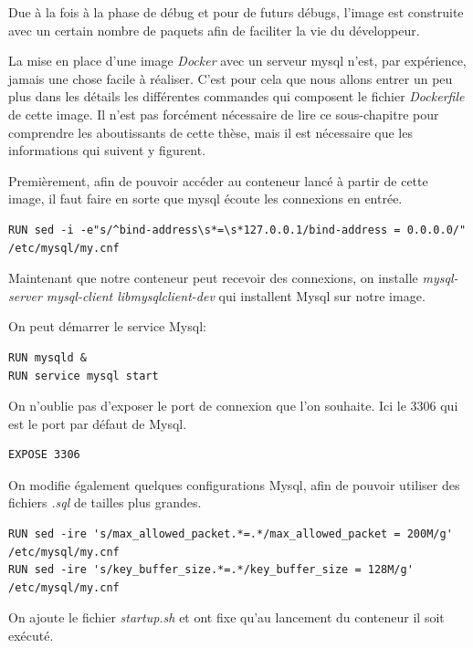 Due à la fois à la phase de débug et pour de futurs débugs, l'image est construite avec un certain nombre de paquets afin de faciliter la vie du développeur.

La mise en place d'une image \emph{Docker} avec un serveur mysql n'est, par expérience, jamais une chose facile à réaliser. C'est pour cela que nous allons entrer un peu plus dans les détails les différentes commandes qui composent le fichier \emph{Dockerfile} de cette image. Il n'est pas forcément nécessaire de lire ce sous-chapitre pour comprendre les aboutissants de cette thèse, mais il est nécessaire que les informations qui suivent y figurent.

Premièrement, afin de pouvoir accéder au conteneur lancé à partir de cette image, il faut faire en sorte que mysql écoute les connexions en entrée.

\lstset{language=bash}

\begin{lstlisting}[frame=single]
RUN sed -i -e"s/^bind-address\s*=\s*127.0.0.1/bind-address = 0.0.0.0/" /etc/mysql/my.cnf
\end{lstlisting}

Maintenant que notre conteneur peut recevoir des connexions, on installe \emph{mysql-server mysql-client libmysqlclient-dev} qui installent Mysql sur notre image.

On peut démarrer le service Mysql:

\begin{lstlisting}[frame=single]
RUN mysqld &
RUN service mysql start
\end{lstlisting}

On n’oublie pas d'exposer le port de connexion que l'on souhaite. Ici le 3306 qui est le port par défaut de Mysql.

\begin{lstlisting}[frame=single]
EXPOSE 3306
\end{lstlisting}

On modifie également quelques configurations Mysql, afin de pouvoir utiliser des fichiers \emph{.sql} de tailles plus grandes.

\begin{lstlisting}[frame=single]
RUN sed -ire 's/max_allowed_packet.*=.*/max_allowed_packet = 200M/g' /etc/mysql/my.cnf
RUN sed -ire 's/key_buffer_size.*=.*/key_buffer_size = 128M/g' /etc/mysql/my.cnf
\end{lstlisting}

On ajoute le fichier \emph{startup.sh} et ont fixe qu'au lancement du conteneur il soit exécuté.

